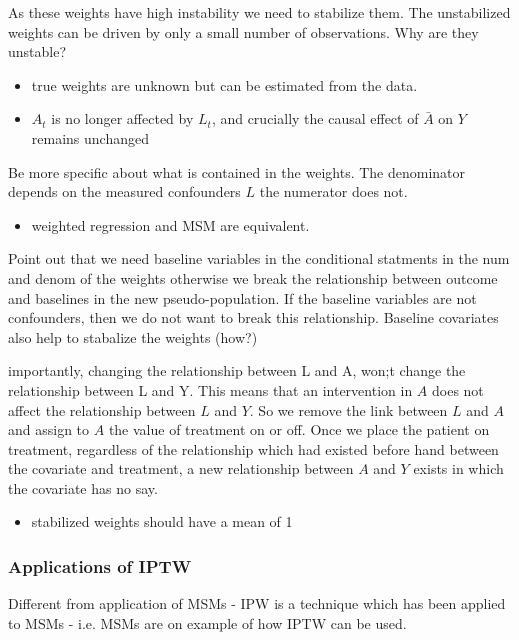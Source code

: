 \documentclass[11pt]{article}
\providecommand{\tightlist}{%
      \setlength{\itemsep}{0pt}\setlength{\parskip}{0pt}}
\begin{document}
As these weights have high instability we need to stabilize them. The
unstabilized weights can be driven by only a small number of
observations. Why are they unstable?

\begin{itemize}
\tightlist
\item
  true weights are unknown but can be estimated from the data.
\item
  \(A_t\) is no longer affected by \(L_t\), and crucially the causal
  effect of \(\bar A\) on \(Y\) remains unchanged
\end{itemize}

Be more specific about what is contained in the weights. The denominator
depends on the measured confounders \(L\) the numerator does not.

\begin{itemize}
\tightlist
\item
  weighted regression and MSM are equivalent.
\end{itemize}

Point out that we need baseline variables in the conditional statments
in the num and denom of the weights otherwise we break the relationship
between outcome and baselines in the new pseudo-population. If the
baseline variables are not confounders, then we do not want to break
this relationship. Baseline covariates also help to stabalize the
weights (how?)

importantly, changing the relationship between L and A, won;t change the
relationship between L and Y. This means that an intervention in \(A\)
does not affect the relationship between \(L\) and \(Y\). So we remove
the link between \(L\) and \(A\) and assign to \(A\) the value of
treatment on or off. Once we place the patient on treatment, regardless
of the relationship which had existed before hand between the covariate
and treatment, a new relationship between \(A\) and \(Y\) exists in
which the covariate has no say.

\begin{itemize}
\tightlist
\item
  stabilized weights should have a mean of 1
\end{itemize}

\subsubsection{Applications of IPTW}\label{applications-of-iptw}

Different from application of MSMs - IPW is a technique which has been
applied to MSMs - i.e. MSMs are on example of how IPTW can be used.
\end{document}
